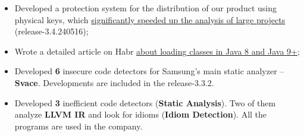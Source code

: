 \documentclass[10pt,a4paper,ragged2e,withhyper]{custom-altacv}
\begin{document}


\makecvheader



\begin{paracol}{2}


\begin{itemize}
	\item Developed a protection system for the distribution of our product using physical keys, which \href{https://svace.pages.ispras.ru/svace-website/2024/05/16/release-3-4-240516.html}{\textcolor{url}{significantly speeded up the analysis of large projects}} (release-3.4.240516);
	\item Wrote a detailed article on Habr
	\href{https://habr.com/ru/companies/isp_ras/articles/788618/}{\textcolor{url}{about loading classes in Java 8 and Java 9+}};
	\item Developed \textbf{6} insecure code detectors for Samsung's main static analyzer -- \textbf{Svace}. Developments are included in the release-3.3.2.
\end{itemize}

\divider


\begin{itemize}
	\item Developed \textbf{3} inefficient code detectors (\textbf{Static Analysis}). Two of them analyze \textbf{LLVM IR} and look for idioms (\textbf{Idiom Detection}). All the programs are used in the company.
\end{itemize}



\end{paracol}
\end{document}
